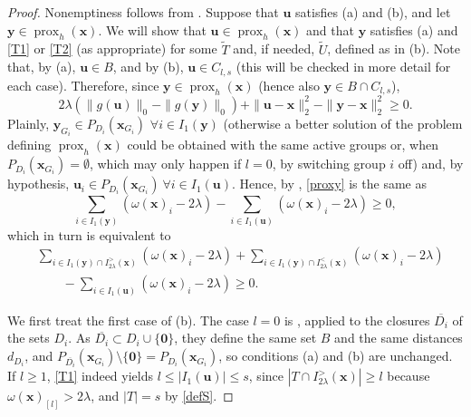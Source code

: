 \documentclass[11pt,a4paper]{article}
\theoremstyle{plain}
\theoremstyle{definition}
\theoremstyle{remark}
\newcommand*{\vz}{\mathbf{0}}
\newcommand*\x{\mathbf{x}}
\newcommand*\U{\mathbf{u}}
\newcommand*\y{\mathbf{y}}
\newcommand*\prox{\operatorname{prox}}
\begin{document}
\begin{proof}
  Nonemptiness follows from .
  Suppose that \(\U\) satisfies (a) and (b), and let \(\y \in \prox_{h}(\x)\).
  We will show that \(\U \in \prox_h(\x)\) and that \(\y\) satisfies (a) and \eqref{T1} or \eqref{T2} (as appropriate) for some \(\tilde{T}\) and, if needed, \(\tilde{U}\), defined as in (b).
  Note that, by (a), \(\U\in B\), and by (b), \(\U\in C_{l,s}\) (this will be checked in more detail for each case).
  Therefore, since \(\y \in \prox_h(\x)\)
  (hence also \(\y\in B\cap C_{l,s}\)),
  \begin{equation}
    \label{proxy}
    2 \lambda\left(\|g(\U)\|_0-\|g(\y)\|_0\right)+\|\U-\x\|_2^2-\|\y-\x\|_2^2 \geq 0 .
  \end{equation}
  Plainly, \(\y_{G_i} \in P_{D_i}\left(\x_{G_i}\right)\) \(\forall i \in I_1(\y)\) (otherwise a better solution of the problem defining \(\prox_h(\x)\) could be obtained with the same active groups or, when \(P_{D_i}(\x_{G_i})=\emptyset\), which may only happen if \(l=0\), by switching group \(i\) off) and, by hypothesis, \(\U_i \in P_{D_i}\left(\x_{G_i}\right)\ \forall i \in I_1(\U)\).
  Hence, by , \eqref{proxy} is the same as
  $$
    \sum_{i \in I_1(\y)}\left(\omega(\x)_i-2 \lambda\right)-\sum_{i \in I_1(\U)}\left(\omega(\x)_i-2 \lambda\right) \geq 0,
  $$
  which in turn is equivalent to
  \begin{equation}
    \label{main1}
    \begin{aligned}
       & \sum_{i \in I_1(\y) \cap I_{2\lambda}^>(\x)}\left(\omega(\x)_i-2 \lambda\right)+\sum_{i \in I_1(\y) \cap I^<_{2\lambda}(\x)}\left(\omega(\x)_i-2 \lambda\right) \\
       & \qquad-\sum_{i \in I_1(\U)}\left(\omega(\x)_i-2 \lambda\right) \geq 0 .
    \end{aligned}
  \end{equation}

  We first treat the first case of (b).
  The case \(l=0\) is \cite[Theorem~3.2]{beck2018}, applied to the closures \(\overline{D_i}\) of the sets \(D_i\).
  As \(\overline{D_i}\subset D_i\cup\{\vz\}\), they define the same set \(B\) and the same distances \(d_{D_i}\), and \(P_{\overline{D_i}}(\x_{G_i})\setminus\{\vz\}=P_{D_i}(\x_{G_i})\), so conditions (a) and (b) are unchanged.
  If \(l\geq 1\), \eqref{T1} indeed yields \(l\leq |I_1(\U)|\leq s\), since \(|T \cap I_{2\lambda}^>(\x)|\geq l\) because \(\omega(\x)_{[l]}> 2\lambda\), and \(|T|=s\) by \eqref{defS}.


\end{proof}
\end{document}
